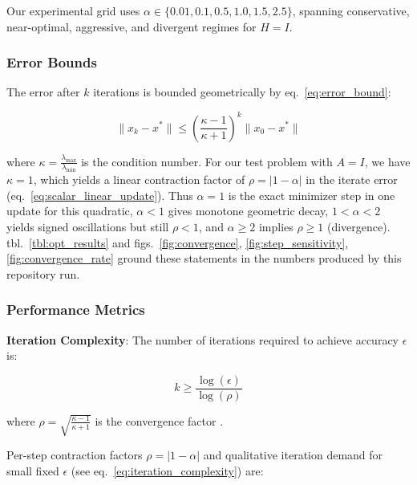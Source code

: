 \documentclass[
  english,
]{article}
\begin{document}
Our experimental grid uses
\(\alpha \in \{0.01, 0.1, 0.5, 1.0, 1.5, 2.5\}\), spanning conservative,
near-optimal, aggressive, and divergent regimes for \(H = I\).

\subsubsection{Error Bounds}\label{error-bounds}

The error after \(k\) iterations is bounded geometrically by
eq.~\ref{eq:error_bound}:

\begin{equation}
\label{eq:error_bound}
\|x_k - x^*\| \leq \left(\frac{\kappa - 1}{\kappa + 1}\right)^k \|x_0 - x^*\|
\end{equation}

where \(\kappa = \frac{\lambda_{\max}}{\lambda_{\min}}\) is the
condition number. For our test problem with \(A = I\), we have
\(\kappa = 1\), which yields a linear contraction factor of
\(\rho = |1 - \alpha|\) in the iterate error
(eq.~\ref{eq:scalar_linear_update}). Thus \(\alpha = 1\) is the exact
minimizer step in one update for this quadratic, \(\alpha < 1\) gives
monotone geometric decay, \(1 < \alpha < 2\) yields signed oscillations
but still \(\rho < 1\), and \(\alpha \geq 2\) implies \(\rho \geq 1\)
(divergence). tbl.~\ref{tbl:opt_results} and
figs.~\ref{fig:convergence}, \ref{fig:step_sensitivity}, \ref{fig:convergence_rate}
ground these statements in the numbers produced by this repository run.

\subsubsection{Performance Metrics}\label{performance-metrics}

\textbf{Iteration Complexity}: The number of iterations required to
achieve accuracy \(\epsilon\) is:

\begin{equation}
\label{eq:iteration_complexity}
k \geq \frac{\log(\epsilon)}{\log(\rho)}
\end{equation}

where \(\rho = \sqrt{\frac{\kappa - 1}{\kappa + 1}}\) is the convergence
factor \citep{polyak1964some}.

Per-step contraction factors \(\rho = |1-\alpha|\) and qualitative
iteration demand for small fixed \(\epsilon\) (see
eq.~\ref{eq:iteration_complexity}) are:
\end{document}
